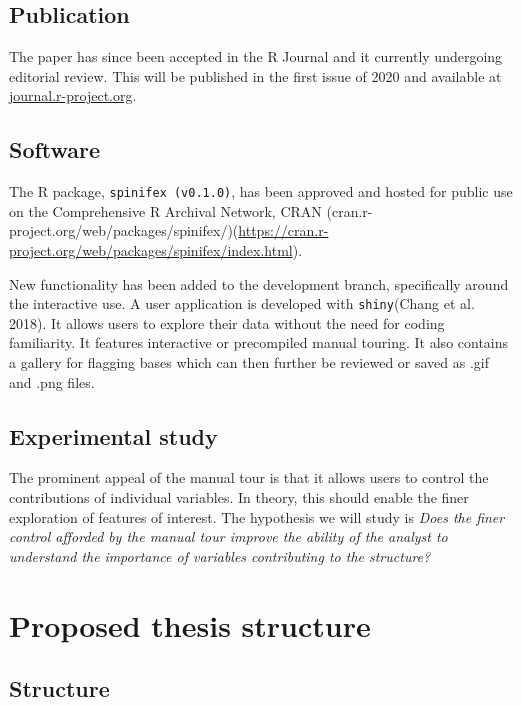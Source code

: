 \documentclass[11,]{article}
\theoremstyle{definition}
\theoremstyle{definition}
\theoremstyle{definition}
\theoremstyle{remark}
\begin{document}
\subsection{Publication}\label{publication}

The paper has since been accepted in the R Journal and it currently
undergoing editorial review. This will be published in the first issue
of 2020 and available at
\href{https://journal.r-project.org/}{journal.r-project.org}.

\subsection{Software}\label{software}

The R package, \texttt{spinifex\ (v0.1.0)}, has been approved and hosted
for public use on the Comprehensive R Archival Network, CRAN
(cran.r-project.org/web/packages/spinifex/)(\url{https://cran.r-project.org/web/packages/spinifex/index.html}).

New functionality has been added to the development branch, specifically
around the interactive use. A user application is developed with
\texttt{shiny}(Chang et al. 2018). It allows users to explore their data
without the need for coding familiarity. It features interactive or
precompiled manual touring. It also contains a gallery for flagging
bases which can then further be reviewed or saved as .gif and .png
files.

\subsection{Experimental study}\label{experimental-study}

The prominent appeal of the manual tour is that it allows users to
control the contributions of individual variables. In theory, this
should enable the finer exploration of features of interest. The
hypothesis we will study is \emph{Does the finer control afforded}
\emph{by the manual tour improve the ability of the analyst to
understand the} \emph{importance of variables contributing to the
structure?}

\section{Proposed thesis structure}\label{proposed-thesis-structure}

\subsection{Structure}\label{structure}
\end{document}
